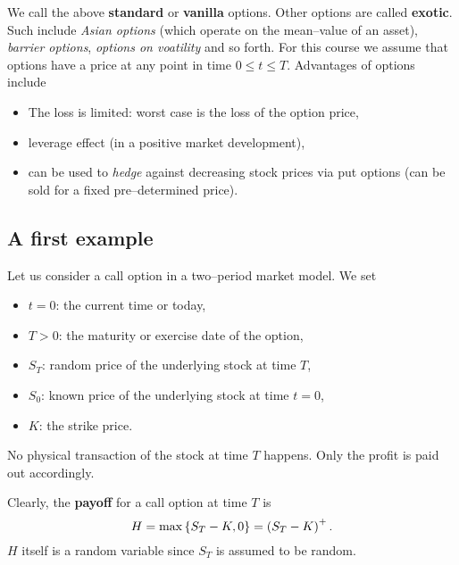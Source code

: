 \documentclass[12pt]{amsart}
\begin{document}
We call the above \textbf{standard} or \textbf{vanilla} options. Other options are called \textbf{exotic}. Such include \emph{Asian options} (which operate on the mean--value of an asset), \emph{barrier options}, \emph{options on voatility} and so forth. For this course we assume that options have a price at any point in time \(0 \leq t \leq T\). Advantages of options include
\begin{itemize}
    \item The loss is limited: worst case is the loss of the option price,
    \item leverage effect (in a positive market development),
    \item can be used to \emph{hedge} against decreasing stock prices via put options (can be sold for a fixed pre--determined price).
\end{itemize}

\subsection{A first example}

Let us consider a call option in a two--period market model. We set
\begin{itemize}
    \item \(t=0\): the current time or today,
    \item \(T>0\): the maturity or exercise date of the option,
    \item \(S_T\): random price of the underlying stock at time \(T\),
    \item \(S_0\): known price of the underlying stock at time \(t=0\),
    \item \(K\): the strike price.
\end{itemize}

\begin{remark}
    No physical transaction of the stock at time \(T\) happens. Only the profit is paid out accordingly.
\end{remark}
Clearly, the \textbf{payoff} for a call option at time \(T\) is \[
    H = \max \left\{ S_T-K, 0 \right\} = \left(S_T-K\right)^+.
\]
\(H\) itself is a random variable since \(S_T\) is assumed to be random.
\end{document}
